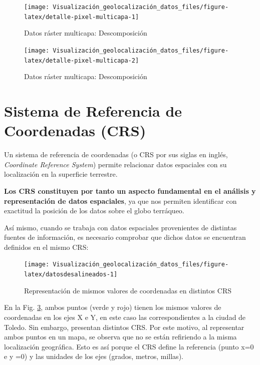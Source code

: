 \documentclass[
]{book}
\theoremstyle{definition}
\theoremstyle{definition}
\theoremstyle{definition}
\theoremstyle{definition}
\theoremstyle{remark}
\begin{document}
\begin{figure}

{\centering \texttt{[image: Visualización\_geolocalización\_datos\_files/figure-latex/detalle-pixel-multicapa-1]} 

}

\caption{Datos ráster multicapa: Descomposición}\label{fig:detalle-pixel-multicapa-1}
\end{figure}
\begin{figure}

{\centering \texttt{[image: Visualización\_geolocalización\_datos\_files/figure-latex/detalle-pixel-multicapa-2]} 

}

\caption{Datos ráster multicapa: Descomposición}\label{fig:detalle-pixel-multicapa-2}
\end{figure}

\hypertarget{CRS}{%
\section{Sistema de Referencia de Coordenadas (CRS)}\label{CRS}}

Un sistema de referencia de coordenadas (o CRS por sus siglas en inglés,
\emph{Coordinate Reference System}) permite relacionar datos espaciales con su
localización en la superficie terrestre.

\textbf{Los CRS constituyen por tanto un aspecto fundamental en el análisis y
representación de datos espaciales}, ya que nos permiten identificar con
exactitud la posición de los datos sobre el globo terráqueo.

Así mismo, cuando se trabaja con datos espaciales provenientes de distintas
fuentes de información, es necesario comprobar que dichos datos se encuentran
definidos en el mismo CRS:

\begin{figure}

{\centering \texttt{[image: Visualización\_geolocalización\_datos\_files/figure-latex/datosdesalineados-1]} 

}

\caption{Representación de mismos valores de coordenadas en distintos CRS}\label{fig:datosdesalineados}
\end{figure}

En la Fig. \ref{fig:datosdesalineados}, ambos puntos (verde y rojo) tienen los
mismos valores de coordenadas en los ejes X e Y, en este caso las
correspondientes a la ciudad de Toledo. Sin embargo, presentan distintos CRS.
Por este motivo, al representar ambos puntos en un mapa, se observa que no se
están refiriendo a la misma localización geográfica. Esto es así porque el CRS
define la referencia (punto x=0 e y =0) y las unidades de los ejes (grados,
metros, millas).
\end{document}
